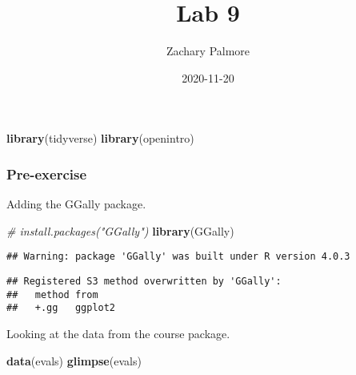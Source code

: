 \documentclass[
]{article}
\title{Lab 9}
\author{Zachary Palmore}
\date{2020-11-20}
\newenvironment{Shaded}{\begin{snugshade}}{\end{snugshade}}
\newcommand{\CommentTok}[1]{\textcolor[rgb]{0.56,0.35,0.01}{\textit{#1}}}
\newcommand{\KeywordTok}[1]{\textcolor[rgb]{0.13,0.29,0.53}{\textbf{#1}}}
\newcommand{\NormalTok}[1]{#1}
\begin{document}
\maketitle

\begin{Shaded}
\begin{Highlighting}[]
\KeywordTok{library}\NormalTok{(tidyverse)}
\KeywordTok{library}\NormalTok{(openintro)}
\end{Highlighting}
\end{Shaded}

\hypertarget{pre-exercise}{%
\subsubsection{Pre-exercise}\label{pre-exercise}}

Adding the GGally package.

\begin{Shaded}
\begin{Highlighting}[]
\CommentTok{# install.packages("GGally")}
\KeywordTok{library}\NormalTok{(GGally)}
\end{Highlighting}
\end{Shaded}

\begin{verbatim}
## Warning: package 'GGally' was built under R version 4.0.3
\end{verbatim}

\begin{verbatim}
## Registered S3 method overwritten by 'GGally':
##   method from   
##   +.gg   ggplot2
\end{verbatim}

Looking at the data from the course package.

\begin{Shaded}
\begin{Highlighting}[]
\KeywordTok{data}\NormalTok{(evals)}
\KeywordTok{glimpse}\NormalTok{(evals)}
\end{Highlighting}
\end{Shaded}
\end{document}
